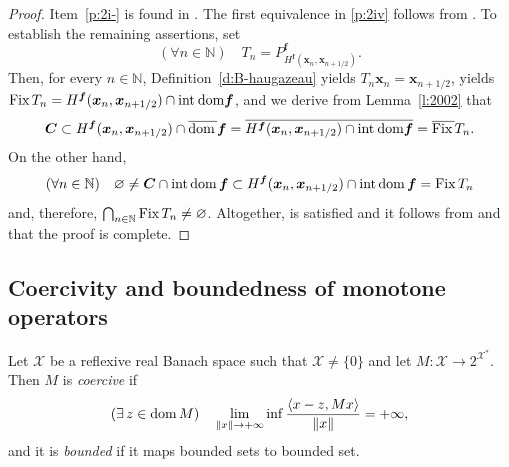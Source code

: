 \documentclass[a4paper,11pt,fleqn]{article}
\newcommand{\pair}[2]{\langle{{#1},{#2}}\rangle}
\newcommand{\IDDB}{\ensuremath{\text{\rm int\:dom}\boldsymbol{f}}}
\newcommand{\XX}{\ensuremath{{\mathcal X}}}
\newcommand{\emp}{\ensuremath{{\varnothing}}}
\newcommand{\NN}{\ensuremath{\mathbb N}}
\newcommand{\exi}{\ensuremath{\exists\,}}
\newcommand{\pinf}{\ensuremath{{+\infty}}}
\newcommand{\dom}{\ensuremath{\text{\rm dom}\,}}
\newcommand{\intdom}{\ensuremath{\text{\rm int\,dom}\,}}
\newcommand{\Fix}{\ensuremath{\text{\rm Fix}\,}}
\theoremstyle{plain}{\theorembodyfont{\rmfamily}%
\newtheorem{conjecture}[theorem]{Conjecture}}
\theoremstyle{plain}{\theorembodyfont{\rmfamily}%
\newtheorem{example}[theorem]{Example}}
\theoremstyle{plain}{\theorembodyfont{\rmfamily}%
\newtheorem{remark}[theorem]{Remark}}
\theoremstyle{plain}{\theorembodyfont{\rmfamily}%
\newtheorem{algorithm}[theorem]{Algorithm}}
\theoremstyle{plain}{\theorembodyfont{\rmfamily}%
\newtheorem{condition}[theorem]{Condition}}
\theoremstyle{plain}{\theorembodyfont{\rmfamily}%
\newtheorem{definition}[theorem]{Definition}}
\theoremstyle{plain}{\theorembodyfont{\rmfamily}
\newtheorem{problem}[theorem]{Problem}}
\theoremstyle{plain}{\theorembodyfont{\rmfamily}
\newtheorem{notation}[theorem]{Notation}}
\numberwithin{equation}{section}
\begin{document}
\begin{proof}
Item~\ref{p:2i-} is found in 
\cite[Proof of Proposition~3.3]{Pams03}.
The first equivalence in \ref{p:2iv} follows from
\cite[Propositions~2.2(ii)]{Pams03}. To establish the remaining
assertions, set
\begin{equation}
\label{epOlk28ha21a}
(\forall n\in\NN)\quad T_n=
P_{H^{\boldsymbol{f}}
(\boldsymbol{x}_n,\boldsymbol{x}_{n+1/2})}^{\boldsymbol{f}}.
\end{equation}
Then, for every $n\in\NN$, Definition~\ref{d:B-haugazeau}
yields
$T_n\boldsymbol{x}_n=\boldsymbol{x}_{n+1/2}$, 
\cite[Proposition~3.32(ii)(b)]{Sico03} yields
$\Fix T_n=H^{\boldsymbol{f}}(\boldsymbol{x}_n,\boldsymbol{x}_{n+1/2})
\cap\IDDB$, and we derive from Lemma~\ref{l:2002} that
\begin{equation}
\label{epOlk28ha21b}
\boldsymbol{C}\subset H^{\boldsymbol{f}}
(\boldsymbol{x}_n,\boldsymbol{x}_{n+1/2})
\cap\overline{\dom}\boldsymbol{f}=
\overline{H^{\boldsymbol{f}}
(\boldsymbol{x}_n,\boldsymbol{x}_{n+1/2})\cap\IDDB}
=\overline{\Fix}T_n.
\end{equation}
On the other hand,
\begin{equation}
\label{epOlk28ha21c1}
(\forall n\in\NN)\quad\emp\neq \boldsymbol{C}\cap\intdom
\boldsymbol{f}\subset
H^{\boldsymbol{f}}(\boldsymbol{x}_n,\boldsymbol{x}_{n+1/2})
\cap\intdom\boldsymbol{f}=\Fix T_n
\end{equation}
and, therefore, $\bigcap_{n\in\NN}\Fix T_n\neq\emp$.
Altogether, \cite[Condition~3.2]{Pams03} is satisfied
and it follows from \cite[Propositions~3.3 and 3.4]{Pams03} 
and \cite[Proof of Proposition~3.4(vii)]{Pams03} 
that the proof is complete.
\end{proof}

\subsection{Coercivity and boundedness of monotone operators}

\begin{definition}
\label{d:coer-bou}
Let $\XX$ be a reflexive real Banach space such that 
$\XX\neq\{0\}$ and let $M\colon\XX\to 2^{\XX^*}$. 
Then $M$ is \emph{coercive} if 
\begin{equation}
\label{epOlk28ha21c}
(\exi z\in\dom M)\quad
\lim_{\|x\|\to+\infty}\inf\dfrac{\pair{x-z}{Mx}}{\|x\|}=\pinf,
\end{equation}
and it is \emph{bounded} if it maps bounded sets to bounded set. 
\end{definition}
\end{document}
